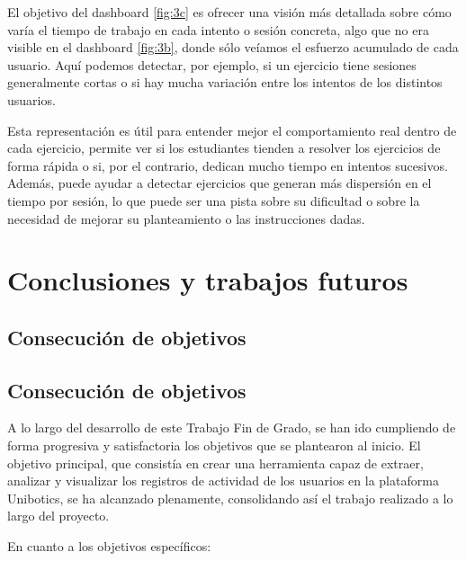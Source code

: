 \documentclass[a4paper, 12pt]{book}
\begin{document}
El objetivo del dashboard \ref{fig:3c} es ofrecer una visión más detallada sobre cómo varía el tiempo de trabajo en cada intento o sesión concreta, algo que no era visible en el dashboard \ref{fig:3b}, donde sólo veíamos el esfuerzo acumulado de cada usuario. Aquí podemos detectar, por ejemplo, si un ejercicio tiene sesiones generalmente cortas o si hay mucha variación entre los intentos de los distintos usuarios.

Esta representación es útil para entender mejor el comportamiento real dentro de cada ejercicio, permite ver si los estudiantes tienden a resolver los ejercicios de forma rápida o si, por el contrario, dedican mucho tiempo en intentos sucesivos. Además, puede ayudar a detectar ejercicios que generan más dispersión en el tiempo por sesión, lo que puede ser una pista sobre su dificultad o sobre la necesidad de mejorar su planteamiento o las instrucciones dadas.


\cleardoublepage



\chapter{Conclusiones y trabajos futuros}
\label{chap:conclusiones}


\section{Consecución de objetivos}
\label{sec:consecucion-objetivos}

\section{Consecución de objetivos}

A lo largo del desarrollo de este Trabajo Fin de Grado, se han ido cumpliendo de forma progresiva y satisfactoria los objetivos que se plantearon al inicio. El objetivo principal, que consistía en crear una herramienta capaz de extraer, analizar y visualizar los registros de actividad de los usuarios en la plataforma Unibotics, se ha alcanzado plenamente, consolidando así el trabajo realizado a lo largo del proyecto.

En cuanto a los objetivos específicos:
\end{document}
